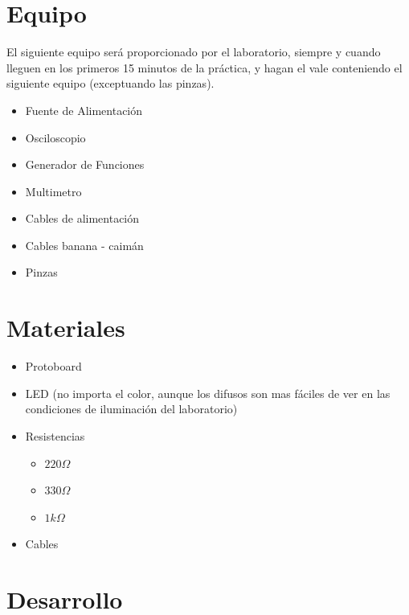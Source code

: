 \section{Equipo}

	El siguiente equipo será proporcionado por el laboratorio, siempre y cuando lleguen en los primeros 15 minutos de la práctica, y hagan el vale conteniendo el siguiente equipo (exceptuando las pinzas).

	\begin{itemize}
		\item Fuente de Alimentación
		\item Osciloscopio
		\item Generador de Funciones
		\item Multimetro
		\item Cables de alimentación
		\item Cables banana - caimán
		\item Pinzas
	\end{itemize}


\section{Materiales}

	\begin{itemize}
		\item Protoboard
		\item LED (no importa el color, aunque los difusos son mas fáciles de ver en las condiciones de iluminación del laboratorio)
		\item Resistencias
		\begin{itemize}
			\item $220 \Omega$
			\item $330 \Omega$
			\item $1 k\Omega$
		\end{itemize}
		\item Cables
	\end{itemize}


\section{Desarrollo}

